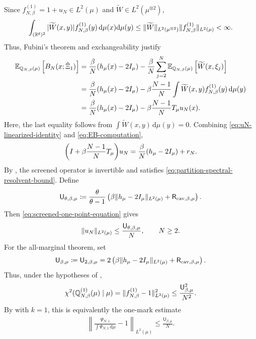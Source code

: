 \documentclass[11pt,reqno]{amsart}
\numberwithin{equation}{section}
\theoremstyle{plain}
\theoremstyle{remark}
\DeclarePairedDelimiter{\pa}{\lparen}{\rparen}
\DeclarePairedDelimiter{\norm}{\lVert}{\rVert}
\renewcommand{\d}{\mathsf{d}}
\newcommand{\md}{\mathrm{d}}
\newcommand{\R}{{\mathbb{R}}}
\newcommand{\E}{{\mathbb{E}}}
\newcommand{\Q}{{\mathbb{Q}}}
\newcommand{\tl}{\widetilde}
\newcommand{\be}{\beta}
\newcommand{\Tc}{T_\mu}
\newcommand{\Chi}{\chi^2}
\begin{document}
Since \(f_{N,\be}^{(1)}=1+u_N\in L^2(\mu)\) and \(\tl W\in L^2(\mu^{\otimes2})\),
\begin{align}\label{eq:screened-Fubini-integrability}
 \int_{(\R^\d)^2}|\tl W(x,y)|f_{N,\be}^{(1)}(y)\,\md\mu(x)\md\mu(y)
 \le \norm{\tl W}_{L^2(\mu^{\otimes2})}
 \norm{f_{N,\be}^{(1)}}_{L^2(\mu)}<\infty.
\end{align}
Thus, Fubini's theorem and exchangeability justify
\begin{align}
\E_{\Q_{N,\be}(\mu)}\left[B_N(x;\hat\Xi_1)\right]
&=\frac{\be}{N}\pa{h_\mu(x)-2I_\mu}
-\frac{\be}{N}\sum_{j=2}^N \E_{\Q_{N,\be}(\mu)}\left[\tl W(x,\xi_j)\right]\notag\\
&=\frac{\be}{N}\pa{h_\mu(x)-2I_\mu}
-\be\frac{N-1}{N}\int \tl W(x,y)f_{N,\be}^{(1)}(y)\,\md\mu(y)\notag\\
&=\frac{\be}{N}\pa{h_\mu(x)-2I_\mu}
-\be\frac{N-1}{N}\Tc u_N(x).\label{eq:EB-computation}
\end{align}
Here, the last equality follows from \(\int \tl W(x,y)\,\md\mu(y)=0\).  Combining \eqref{eq:uN-linearized-identity} and \eqref{eq:EB-computation},
\begin{align}\label{eq:screened-one-point-equation}
 \pa*{I+\be\frac{N-1}{N}\Tc}u_N
 =\frac{\be}{N}\pa{h_\mu-2I_\mu}+r_N.
\end{align}
By , the screened operator is invertible and satisfies \eqref{eq:partition-spectral-resolvent-bound}.  Define
\begin{align}\label{eq:one-point-theta-constant}
 \mathsf U_{\theta,\be,\mu}
 \coloneqq
 \frac{\theta}{\theta-1}
 \left(
 \be\norm{h_\mu-2I_\mu}_{L^2(\mu)}
 +\mathsf R_{\mathrm{cav},\be,\mu}
 \right).
\end{align}
Then \eqref{eq:screened-one-point-equation} gives
\begin{align}\label{eq:one-point-L2-bound}
 \norm{u_N}_{L^2(\mu)}\le \frac{\mathsf U_{\theta,\be,\mu}}{N},
 \qquad N\ge2.
\end{align}
For the all-marginal theorem, set
\begin{align}\label{eq:one-point-constant}
 \mathsf U_{\be,\mu}
 \coloneqq \mathsf U_{2,\be,\mu}
 =2\left(
 \be\norm{h_\mu-2I_\mu}_{L^2(\mu)}
 +\mathsf R_{\mathrm{cav},\be,\mu}
 \right).
\end{align}
Thus, under the hypotheses of ,
\begin{align}\label{eq:one-point-chi2}
 \Chi\pa{\Q_{N,\be}^{(1)}(\mu)\mid\mu}
 =\norm{f_{N,\be}^{(1)}-1}_{L^2(\mu)}^2
 \le \frac{\mathsf U_{\be,\mu}^2}{N^2}.
\end{align}
By  with \(k=1\), this is equivalently the one-mark estimate
\begin{align}\label{eq:one-mark-Psi-final}
 \left\|\frac{\Psi_{N,1}}{\int\Psi_{N,1}\,\md\mu}-1\right\|_{L^2(\mu)}
 \le \frac{\mathsf U_{\be,\mu}}{N}.
\end{align}
\end{document}
